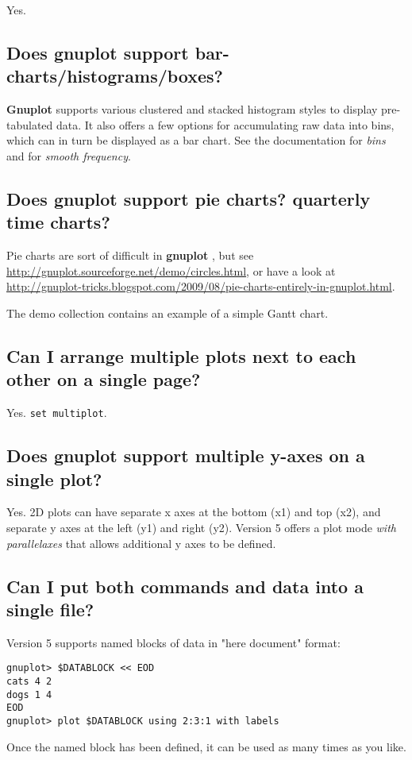 \documentclass[a4paper,11pt]{article}
\def\http#1{{\small\href{http://#1}{\url{http://#1}}}}
\newcommand{\http}[1]%
            {\htmladdnormallink{\latex{\url{http://#1}}%
                    \html{\textit{http://#1}}}%
                {http://#1}%
            }
\newcommand{\gnuplot}{\textbf{gnuplot }}
\newcommand{\Gnuplot}{\textbf{Gnuplot }}
\begin{document}
Yes.

\subsection{Does \gnuplot support bar-charts/histograms/boxes?}

\Gnuplot{} supports various clustered and stacked histogram styles to display
pre-tabulated data.  It also offers a few options for accumulating raw data
into bins, which can in turn be displayed as a bar chart.  See the documentation
for \textit{bins} and for \textit{smooth frequency}.

\subsection{Does \gnuplot support pie charts? quarterly time charts?}

Pie charts are sort of difficult in \gnuplot, but see
\http{gnuplot.sourceforge.net/demo/circles.html}, 
or have a look at
\http{gnuplot-tricks.blogspot.com/2009/08/pie-charts-entirely-in-gnuplot.html}.

The demo collection contains an example of a simple Gantt chart.

\subsection{Can I arrange multiple plots next to each other on a single page?}

Yes. \verb+set multiplot+.

\subsection{Does \gnuplot support multiple y-axes on a single plot?}

Yes. 2D plots can have separate x axes at the bottom (x1) and top (x2),
and separate y axes at the left (y1) and right (y2).  Version 5 offers a
plot mode \textit{with parallelaxes} that allows additional y axes to be
defined.


\subsection{Can I put both commands and data into a single file?}

Version 5 supports named blocks of data in "here document" format:
\small
\begin{verbatim}
gnuplot> $DATABLOCK << EOD
cats 4 2
dogs 1 4
EOD
gnuplot> plot $DATABLOCK using 2:3:1 with labels
\end{verbatim}
\normalsize
Once the named block has been defined, it can be used as many times
as you like.
\end{document}
